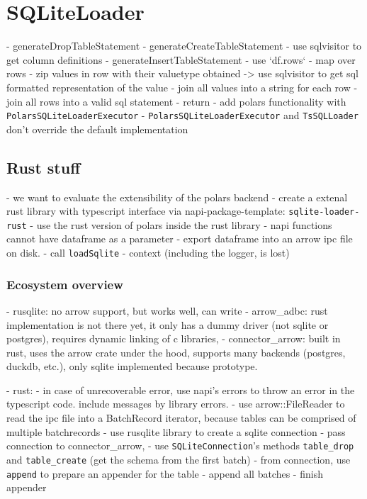 \section{SQLiteLoader}
- generateDropTableStatement
- generateCreateTableStatement
- use sqlvisitor to get column definitions
- generateInsertTableStatement
- use `df.rows`
- map over rows
- zip values in row with their valuetype obtained -> use sqlvisitor to get sql formatted representation of the value
- join all values into a string for each row
- join all rows into a valid sql statement
- return
- add polars functionality with \Verb|PolarsSQLiteLoaderExecutor|
- \Verb|PolarsSQLiteLoaderExecutor| and \Verb|TsSQLLoader| don't override the default implementation

\subsection{Rust stuff}
- we want to evaluate the extensibility of the polars backend
- create a extenal rust library with typescript interface via napi-package-template: \Verb|sqlite-loader-rust|
- use the rust version of polars inside the rust library
- napi functions cannot have dataframe as a parameter %
- export dataframe into an arrow ipc file on disk.
- call \Verb|loadSqlite|
- context (including the logger, is lost)

\subsubsection{Ecosystem overview}
- rusqlite: no arrow support, but works well, can write
- arrow\_adbc: rust implementation is not there yet, it only has a dummy driver (not sqlite or postgres), requires dynamic linking of c libraries,
- connector\_arrow: built in rust, uses the arrow crate under the hood, supports many backends (postgres, duckdb, etc.), only sqlite implemented because prototype.

- rust:
- in case of unrecoverable error, use napi's errors to throw an error in the typescript code. include messages by library errors.
- use arrow::FileReader to read the ipc file into a BatchRecord iterator, because tables can be comprised of multiple batchrecords
- use rusqlite library to create a sqlite connection
- pass connection to connector\_arrow,
- use \Verb|SQLiteConnection|'s methods \Verb|table_drop| and \Verb|table_create| (get the schema from the first batch)
- from connection, use \Verb|append| to prepare an appender for the table
- append all batches
- finish appender









